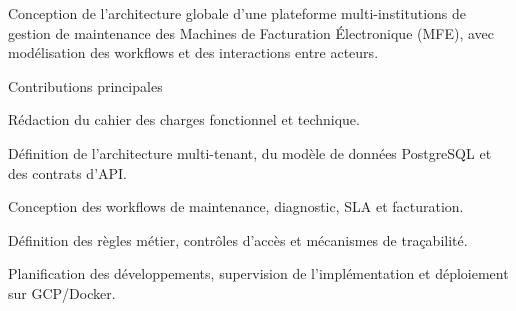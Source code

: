 \begin{cvgroup}

\begin{cvprojectsummary}
Conception de l'architecture globale d'une plateforme multi-institutions de gestion de maintenance des Machines de Facturation Électronique (MFE), avec modélisation des workflows et des interactions entre acteurs.
\end{cvprojectsummary}

\begin{cvdetailslist}{Contributions principales}
  \item {Rédaction du cahier des charges fonctionnel et technique.}
  \item {Définition de l'architecture multi-tenant, du modèle de données PostgreSQL et des contrats d'API.}
  \item {Conception des workflows de maintenance, diagnostic, SLA et facturation.}
  \item {Définition des règles métier, contrôles d'accès et mécanismes de traçabilité.}
  \item {Planification des développements, supervision de l'implémentation et déploiement sur GCP/Docker.}
\end{cvdetailslist}


\end{cvgroup}
